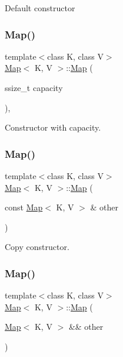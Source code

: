 Default constructor \mbox{\label{classMap_a6a09ecf2e2b5a016be8f3034ef67c051}} 
\subsubsection{\texorpdfstring{Map()}{Map()}\hspace{0.1cm}{\footnotesize\ttfamily [6/8]}}
{\footnotesize\ttfamily template$<$class K, class V$>$ \\
\hyperlink{classMap}{Map}$<$ K, V $>$\+::\hyperlink{classMap}{Map} (\begin{DoxyParamCaption}\item[{ssize\+\_\+t}]{capacity }\end{DoxyParamCaption})\hspace{0.3cm}{\ttfamily [inline]}, {\ttfamily [explicit]}}

Constructor with capacity. \mbox{\label{classMap_afd84c24b9220a40dda8ef82aaf533710}} 
\subsubsection{\texorpdfstring{Map()}{Map()}\hspace{0.1cm}{\footnotesize\ttfamily [7/8]}}
{\footnotesize\ttfamily template$<$class K, class V$>$ \\
\hyperlink{classMap}{Map}$<$ K, V $>$\+::\hyperlink{classMap}{Map} (\begin{DoxyParamCaption}\item[{const \hyperlink{classMap}{Map}$<$ K, V $>$ \&}]{other }\end{DoxyParamCaption})\hspace{0.3cm}{\ttfamily [inline]}}

Copy constructor. \mbox{\label{classMap_adf81c5ca8314af5a2feeffd6a727ac65}} 
\subsubsection{\texorpdfstring{Map()}{Map()}\hspace{0.1cm}{\footnotesize\ttfamily [8/8]}}
{\footnotesize\ttfamily template$<$class K, class V$>$ \\
\hyperlink{classMap}{Map}$<$ K, V $>$\+::\hyperlink{classMap}{Map} (\begin{DoxyParamCaption}\item[{\hyperlink{classMap}{Map}$<$ K, V $>$ \&\&}]{other }\end{DoxyParamCaption})\hspace{0.3cm}{\ttfamily [inline]}}


